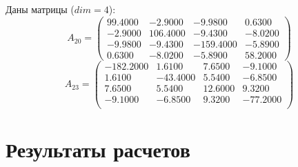 \documentclass[12pt, a4paper]{article}
\begin{document}
    Даны матрицы ($dim = 4$):
    \[
        A_{20} = 
        \begin{pmatrix}
            99.4000  &   -2.9000  &   -9.9800   &   0.6300  \\  
            -2.9000  &  106.4000  &   -9.4300   &  -8.0200  \\  
            -9.9800  &   -9.4300  & -159.4000   &  -5.8900  \\  
             0.6300  &   -8.0200  &   -5.8900   &  58.2000  
        \end{pmatrix}
    \]
    \[
        A_{23} = 
        \begin{pmatrix}
            -182.2000  &    1.6100   &   7.6500  &   -9.1000  \\
               1.6100  &  -43.4000   &   5.5400  &   -6.8500  \\
               7.6500  &    5.5400   &  12.6000  &    9.3200  \\
              -9.1000  &   -6.8500   &   9.3200  &  -77.2000  \\
        \end{pmatrix}
    \]
    \newpage

    \section{Результаты расчетов}
\end{document}
